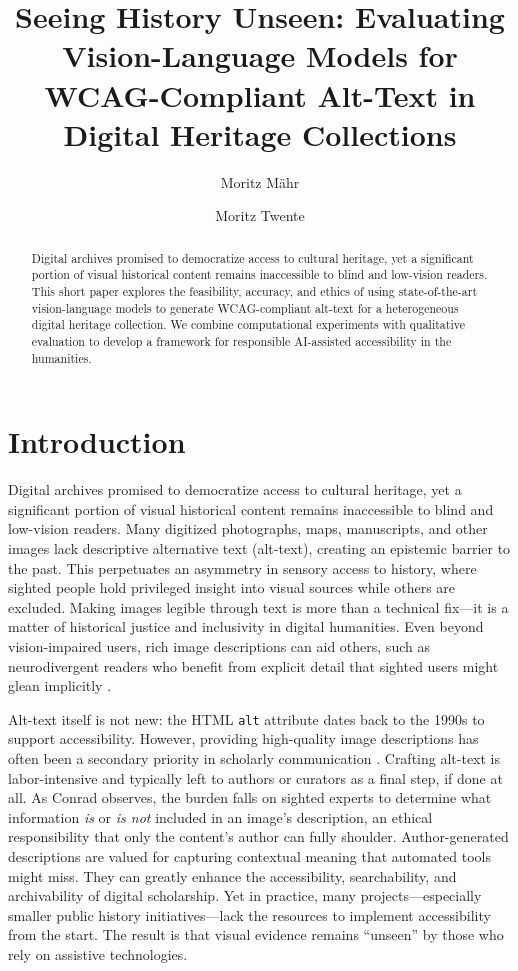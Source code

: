 \documentclass{anthology-ch}         %
\title{Seeing History Unseen: Evaluating Vision-Language Models for WCAG-Compliant Alt-Text in Digital Heritage Collections}
\author[2,1]{Moritz Mähr}[
  orcid=0000-0002-1367-1618
]
\author[1]{Moritz Twente}[
  orcid=0009-0005-7187-9774
]
\affiliation{1}{University of Basel}
\affiliation{2}{University of Bern}
\begin{document}
\maketitle

\begin{abstract}
Digital archives promised to democratize access to cultural heritage, yet a significant portion of visual historical content remains inaccessible to blind and low-vision readers. This short paper explores the feasibility, accuracy, and ethics of using state-of-the-art vision-language models to generate WCAG-compliant alt-text for a heterogeneous digital heritage collection. We combine computational experiments with qualitative evaluation to develop a framework for responsible AI-assisted accessibility in the humanities.
\end{abstract}

\section{Introduction}

Digital archives promised to democratize access to cultural heritage, yet a significant portion of visual historical content remains inaccessible to blind and low-vision readers. Many digitized photographs, maps, manuscripts, and other images lack descriptive alternative text (alt-text), creating an epistemic barrier to the past. This perpetuates an asymmetry in sensory access to history, where sighted people hold privileged insight into visual sources while others are excluded. Making images legible through text is more than a technical fix---it is a matter of historical justice and inclusivity in digital humanities. Even beyond vision-impaired users, rich image descriptions can aid others, such as neurodivergent readers who benefit from explicit detail that sighted users might glean implicitly \autocite{cecilia2023b}.

Alt-text itself is not new: the HTML \texttt{alt} attribute dates back to the 1990s to support accessibility. However, providing high-quality image descriptions has often been a secondary priority in scholarly communication \autocite{cecilia2023a}. Crafting alt-text is labor-intensive and typically left to authors or curators as a final step, if done at all. As Conrad \autocite{conrad2021} observes, the burden falls on sighted experts to determine what information \emph{is} or \emph{is not} included in an image’s description, an ethical responsibility that only the content’s author can fully shoulder. Author-generated descriptions are valued for capturing contextual meaning that automated tools might miss. They can greatly enhance the accessibility, searchability, and archivability of digital scholarship. Yet in practice, many projects---especially smaller public history initiatives---lack the resources to implement accessibility from the start. The result is that visual evidence remains ``unseen'' by those who rely on assistive technologies.
\end{document}
